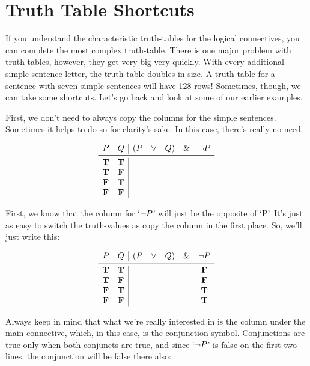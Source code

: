 \documentclass[../logic-text.tex]{subfiles}
\begin{document}
\section{Truth Table Shortcuts}
\label{sec:truth-table-shortc}

If you understand the characteristic truth-tables for the logical connectives, you can complete the most complex truth-table.
There is one major problem with truth-tables, however, they get very big very quickly.
With every additional simple sentence letter, the truth-table doubles in size.
A truth-table for a sentence with seven simple sentences will have 128 rows! Sometimes, though, we can take some shortcuts.
Let's go back and look at some of our earlier examples.

First, we don't need to always copy the columns for the simple sentences.
Sometimes it helps to do so for clarity's sake.
In this case, there's really no need.

\[
  \begin{array}{cc|ccccc}
    P & Q & (P & \lor & Q) & \land & \lneg P \\ \midrule
    \true & \true &&&&&\\
    \true & \false &&&&&\\
    \false & \true &&&&&\\
    \false &\false &&&&&\\
\end{array}
\]

First, we know that the column for \enquote*{\(\neg P\)} will just be the opposite of \enquote*{P}.
It's just as easy to switch the truth-values as copy the column in the first place.
So, we'll just write this:


\[
  \begin{array}{cc|ccccc}
    P & Q & (P & \lor & Q) & \land & \lneg P \\ \midrule
    \true & \true &&&&& \false \\
    \true & \false &&&&& \false \\
    \false & \true &&&&& \true \\
    \false &\false &&&&& \true \\
\end{array}
\]

Always keep in mind that what we're really interested in is the column under the main connective, which, in this case, is the conjunction symbol.
Conjunctions are true only when both conjuncts are true, and since \enquote*{\(\neg P\)} is false on the first two lines, the conjunction will be false there also:
\end{document}
